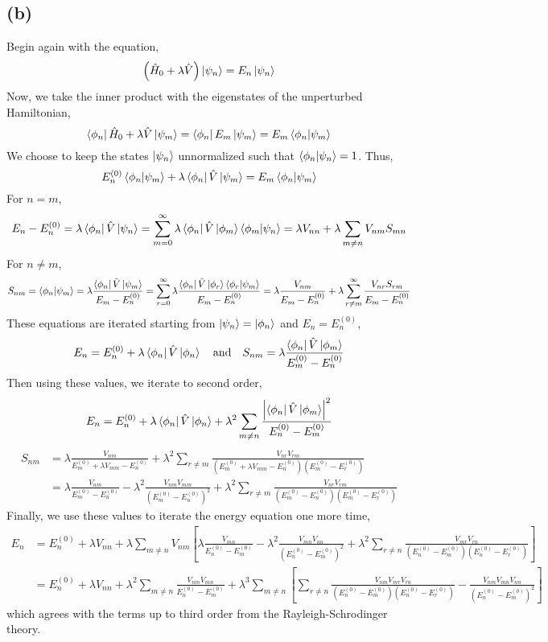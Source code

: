 \documentclass[12pt]{extarticle}
\begin{document}
\subsection*{(b)} 
Begin again with the equation,
\[\left(\hat{H}_0 + \lambda \hat{V} \right) \left| \psi_n \right> = E_n \left| \psi_n \right>\]
Now, we take the inner product with the eigenstates of the unperturbed Hamiltonian,
\[ \left< \phi_n \right| \hat{H}_0 + \lambda \hat{V} \left| \psi_m \right> = \left< \phi_n \right| E_m \left| \psi_m \right>= E_m \left< \phi_n | \psi_m \right>\]
We choose to keep the states $\left| \psi_n \right>$ unnormalized such that $\left< \phi_n | \psi_n \right> = 1$. Thus,
\[ E^{(0)}_n \left< \phi_n | \psi_m \right> + \lambda \left< \phi_n \right| \hat{V} \left| \psi_m \right> = E_m \left< \phi_n | \psi_m \right>\]
For $n = m$,
\[E_n - E^{(0)}_n = \lambda \left< \phi_n \right| \hat{V} \left| \psi_n \right> = \sum_{m = 0}^{\infty} \lambda \left< \phi_n \right| \hat{V} \left| \phi_m \right> \left< \phi_m | \psi_n \right>  = \lambda V_{nn} + \lambda \sum_{m \neq n} V_{nm} S_{mn} \]
For $n \neq m$,
\[S_{nm} = \left< \phi_n | \psi_m \right> = \lambda \frac{\left< \phi_n \right| \hat{V} \left| \psi_m \right>}{E_m - E^{(0)}_n} = \sum_{r = 0}^{\infty} \lambda \frac{\left< \phi_n \right| \hat{V} \left| \phi_r \right> \left< \phi_r | \psi_m \right>}{E_m - E^{(0)}_n} = \lambda \frac{V_{nm}}{E_m - E^{(0)}_n} + \lambda \sum_{r \neq m}^{\infty}\frac{V_{nr} S_{rm}}{E_m - E^{(0)}_n} \]
These equations are iterated starting from $\left| \psi_n \right> = \left| \phi_n \right>$ and $E_n = E^{(0)}_n$,
\[E_n = E^{(0)}_n + \lambda \left< \phi_n \right| \hat{V} \left| \phi_n \right> \quad \text{and} \quad S_{nm} = \lambda \frac{\left< \phi_n \right| \hat{V} \left| \phi_m \right>}{E^{(0)}_m - E^{(0)}_n}\]
Then using these values, we iterate to second order,
\[E_n = E^{(0)}_n + \lambda \left< \phi_n \right| \hat{V} \left| \phi_n \right> + \lambda^2 \sum_{m \neq n} \frac{\left| \left< \phi_n \right| \hat{V} \left| \phi_m \right> \right|^2}{E^{(0)}_n - E^{(0)}_m}\]
\begin{align*}
S_{nm} & = \lambda \frac{V_{nm}}{E^{(0)}_m + \lambda V_{mm} - E^{(0)}_n} + \lambda^2 \sum_{r \neq m} \frac{V_{nr} V_{rm}}{\left(E^{(0)}_m + \lambda V_{mm} - E^{(0)}_n \right)\left(E^{(0)}_m - E^{(0)}_r \right)} \\
& = \lambda \frac{V_{nm}}{E^{(0)}_m - E^{(0)}_n} - \lambda^2 \frac{V_{nm} V_{mm}}{\left(E^{(0)}_m - E^{(0)}_n \right)^2} + \lambda^2 \sum_{r \neq m} \frac{V_{nr} V_{rm}}{\left(E^{(0)}_m - E^{(0)}_n \right)\left(E^{(0)}_m - E^{(0)}_r \right)}
\end{align*}
Finally, we use these values to iterate the energy equation one more time,
\begin{align*}
E_n & = E^{(0)}_n + \lambda V_{nn} + \lambda \sum_{m \neq n} V_{nm} \left[ \lambda \frac{V_{mn}}{E^{(0)}_n - E^{(0)}_m} - \lambda^2 \frac{V_{mn} V_{nn}}{\left(E^{(0)}_n - E^{(0)}_m \right)^2} + \lambda^2 \sum_{r \neq n} \frac{V_{mr} V_{rn}}{\left(E^{(0)}_n - E^{(0)}_m \right)\left(E^{(0)}_n - E^{(0)}_r \right)} \right] \\
& = E^{(0)}_n + \lambda V_{nn} + \lambda^2 \sum_{m \neq n} \frac{V_{nm} V_{mn}}{E^{(0)}_n - E^{(0)}_m} + \lambda^3 \sum_{m \neq n} \left[\sum_{r \neq n} \frac{V_{nm} V_{mr} V_{rn}}{\left(E^{(0)}_n - E^{(0)}_m \right)\left(E^{(0)}_n - E^{(0)}_r \right)} - \frac{V_{nm} V_{mn} V_{nn}}{\left(E^{(0)}_n - E^{(0)}_m \right)^2} \right]
\end{align*}
which agrees with the terms up to third order from the Rayleigh-Schrodinger theory.
\end{document}

